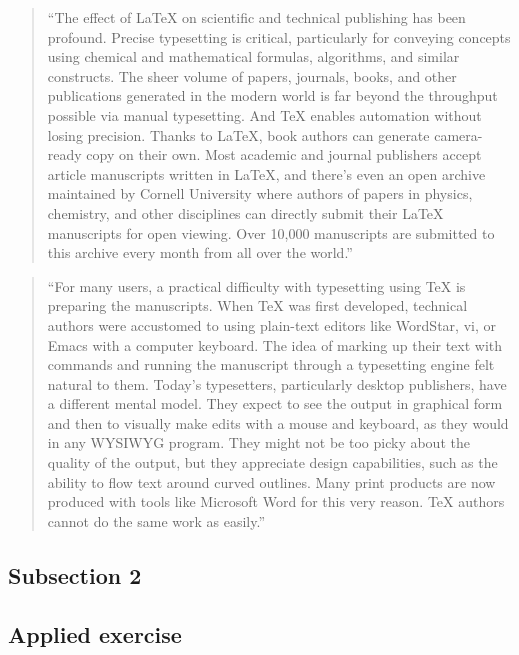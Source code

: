 \documentclass[]{tufte-book}
\begin{document}
\begin{quote}
``The effect of LaTeX on scientific and technical publishing has been profound.
Precise typesetting is critical, particularly for conveying concepts using
chemical and mathematical formulas, algorithms, and similar constructs. The
sheer volume of papers, journals, books, and other publications generated in the
modern world is far beyond the throughput possible via manual typesetting. And
TeX enables automation without losing precision. Thanks to LaTeX, book authors
can generate camera-ready copy on their own. Most academic and journal
publishers accept article manuscripts written in LaTeX, and there's even an open
archive maintained by Cornell University where authors of papers in physics,
chemistry, and other disciplines can directly submit their LaTeX manuscripts for
open viewing. Over 10,000 manuscripts are submitted to this archive every month
from all over the world.'' \citep{apte2019lingua}
\end{quote}

\begin{quote}
``For many users, a practical difficulty with typesetting using TeX is
preparing the manuscripts. When TeX was first developed, technical authors were
accustomed to using plain-text editors like WordStar, vi, or Emacs with a
computer keyboard. The idea of marking up their text with commands and running
the manuscript through a typesetting engine felt natural to them. Today's
typesetters, particularly desktop publishers, have a different mental model.
They expect to see the output in graphical form and then to visually make edits
with a mouse and keyboard, as they would in any WYSIWYG program. They might not
be too picky about the quality of the output, but they appreciate design
capabilities, such as the ability to flow text around curved outlines. Many
print products are now produced with tools like Microsoft Word for this very
reason. TeX authors cannot do the same work as easily.'' \citep{apte2019lingua}
\end{quote}

\hypertarget{subsection-2-13}{%
\subsection{Subsection 2}\label{subsection-2-13}}

\hypertarget{applied-exercise-7}{%
\subsection{Applied exercise}\label{applied-exercise-7}}
\end{document}
